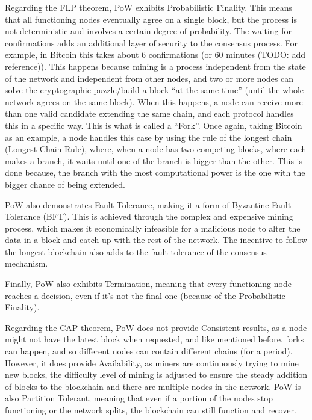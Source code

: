 Regarding the FLP theorem, PoW exhibits Probabilistic Finality. This means that all functioning nodes eventually agree on a single block, but the process is not deterministic and involves a certain degree of probability. The waiting for confirmations adds an additional layer of security to the consensus process. For example, in Bitcoin this takes about 6 confirmations (or 60 minutes (TODO: add reference)). This happens because mining is a process independent from the state of the network and independent from other nodes, and two or more nodes can solve the cryptographic puzzle/build a block ``at the same time'' (until the whole network agrees on the same block).
When this happens, a node can receive more than one valid candidate extending the same chain, and each protocol handles this in a specific way. This is what is called a ``Fork''.
Once again, taking Bitcoin as an example, a node handles this case by using the rule of the longest chain (Longest Chain Rule), where, when a node has two competing blocks, where each makes a branch, it waits until one of the branch is bigger than the other.
This is done because, the branch with the most computational power is the one with the bigger chance of being extended.

PoW also demonstrates Fault Tolerance, making it a form of Byzantine Fault Tolerance (BFT). This is achieved through the complex and expensive mining process, which makes it economically infeasible for a malicious node to alter the data in a block and catch up with the rest of the network. The incentive to follow the longest blockchain also adds to the fault tolerance of the consensus mechanism.

Finally, PoW also exhibits Termination, meaning that every functioning node reaches a decision, even if it's not the final one (because of the Probabilistic Finality). 

Regarding the CAP theorem, PoW does not provide Consistent results, as a node might not have the latest block when requested, and like mentioned before, forks can happen, and so different nodes can contain different chains (for a period).
However, it does provide Availability, as miners are continuously trying to mine new blocks, the difficulty level of mining is adjusted to ensure the steady addition of blocks to the blockchain and there are multiple nodes in the network.
PoW is also Partition Tolerant, meaning that even if a portion of the nodes stop functioning or the network splits, the blockchain can still function and recover.

